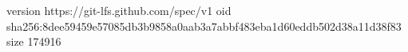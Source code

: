 version https://git-lfs.github.com/spec/v1
oid sha256:8dee59459e57085db3b9858a0aab3a7abbf483eba1d60eddb502d38a11d38f83
size 174916
